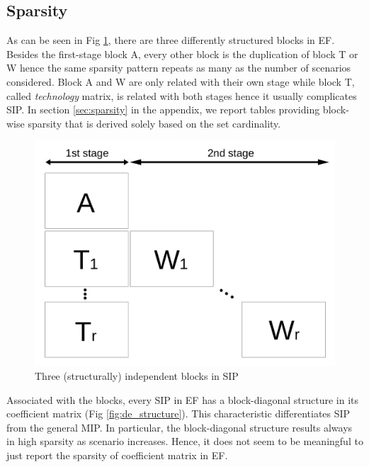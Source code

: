 \subsection{Sparsity} \label{subsec:sparsity}
As can be seen in Fig \ref{fig:stagewise_sparsity}, there are three differently structured blocks in EF. Besides the first-stage block A, every other block is the duplication of block T or W hence the same sparsity pattern repeats as many as the number of scenarios considered. Block A and W are only related with their own stage while block T, called \textit{technology} matrix, is related with both stages hence it usually complicates SIP. In section \ref{sec:sparsity} in the appendix, we report tables providing block-wise sparsity that is derived solely based on the set cardinality.
\begin{figure}[H]
	\centering
	\includegraphics[width=0.5\linewidth]{drawings/stagewise_sparsity}
	\caption{Three (structurally) independent blocks in SIP}
	\label{fig:stagewise_sparsity}
\end{figure}
Associated with the blocks, every SIP in EF has a block-diagonal structure in its coefficient matrix (Fig \ref{fig:de_structure}). This characteristic differentiates SIP from the general MIP. In particular, the block-diagonal structure results always in high sparsity as scenario increases. Hence, it does not seem to be meaningful to just report the sparsity of coefficient matrix in EF.

